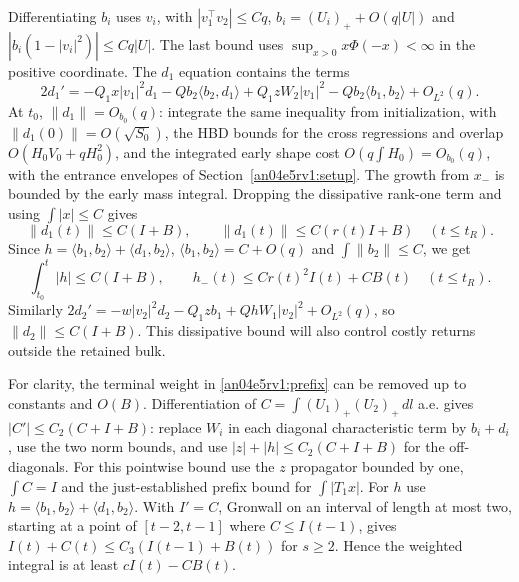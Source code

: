 \documentclass[11pt]{article}
\newcommand{\dd}{\,dl}
\newcommand{\norm}[1]{\lVert #1\rVert}
\begin{document}
Differentiating $b_i$ uses $v_i$, with $|v_1^\top v_2|\le Cq$,
$b_i=(U_i)_++O(q|U|)$ and
$|b_i(1-|v_i|^2)|\le Cq|U|$. The last bound uses
$\sup_{x>0}x\Phi(-x)<\infty$ in the positive coordinate.
The $d_1$ equation contains the terms
\[
 2d_1'=-Q_1x|v_1|^2d_1-Qb_2\langle b_2,d_1\rangle+
 Q_1 z W_2 |v_1|^2-Qb_2\langle b_1,b_2\rangle+O_{L^2}(q).
\]
At $t_0$, $\norm{d_1}=O_{b_0}(q)$: integrate the same inequality from
initialization, with $\norm{d_1(0)}=O(\sqrt{S_0})$, the HBD bounds for
the cross regressions and overlap $O(H_0V_0+qH_0^2)$, and the integrated
early shape cost $O(q\int H_0)=O_{b_0}(q)$, with the entrance envelopes of Section~\ref{an04e5rv1:setup}. The growth from $x_-$ is bounded by the early mass integral.
Dropping the dissipative rank-one term and using $\int |x|\le C$ gives
\[
 \norm{d_1(t)}\le C(I+B),\qquad
 \norm{d_1(t)}\le C(r(t)I+B)\quad(t\le t_R).
\]
Since $h=\langle b_1,b_2\rangle+\langle d_1,b_2\rangle$,
$\langle b_1,b_2\rangle=C+O(q)$ and $\int\norm{b_2}\le C$, we get
\begin{equation}
 \int_{t_0}^t|h|\le C(I+B),\qquad
 h_-(t)\le C r(t)^2 I(t)+C B(t)\quad(t\le t_R).
 \label{an04e5rv1:earlyh}
\end{equation}
Similarly $2d_2'=-w|v_2|^2d_2-Q_1zb_1+QhW_1|v_2|^2+O_{L^2}(q)$, so
$\norm{d_2}\le C(I+B)$. This dissipative bound will also control costly
returns outside the retained bulk.

For clarity, the terminal weight in \eqref{an04e5rv1:prefix} can be removed
up to constants and $O(B)$. Differentiation of
$C=\int(U_1)_+(U_2)_+\dd$ a.e. gives $|C'|\le C_2(C+I+B)$:
replace $W_i$ in each diagonal characteristic term by $b_i+d_i$,
use the two norm bounds, and use
$|z|+|h|\le C_2(C+I+B)$ for the off-diagonals. For this pointwise bound use the $z$ propagator bounded by one, $\int C=I$ and the just-established prefix bound for $\int|T_1 x|$. For $h$ use $h=\langle b_1,b_2\rangle+\langle d_1,b_2\rangle$.
With $I'=C$, Gronwall on an interval of length at most two,
starting at a point of $[t-2,t-1]$ where $C\le I(t-1)$, gives
$I(t)+C(t)\le C_3(I(t-1)+B(t))$ for $s\ge2$. Hence the weighted integral
is at least $cI(t)-CB(t)$.
\end{document}
